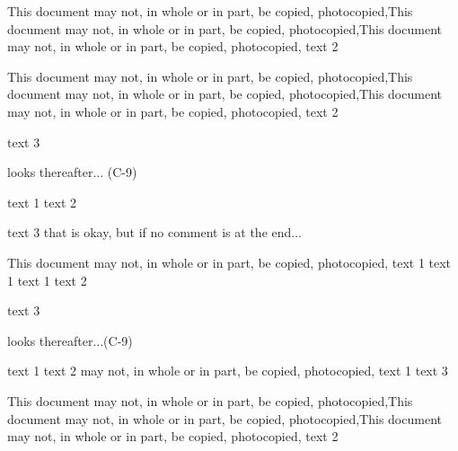 This document may not, in whole or in part, be copied, photocopied,This document may not, in whole or in part, be copied, photocopied,This document
may not, in whole or in part, be copied, photocopied, text 2
%
%
%
%
%
%
% 
%
%
%
% 
% 
%

This  document  may  not, in  whole  or in  part, be  copied,  photocopied,This  document  may  not, in  whole  or in  part, be  copied,  photocopied,This  document  may  not, in  whole  or in  part, be  copied,  photocopied,
text 2

text 3

looks thereafter... (C-9)

text 1 text 2

text 3
 that is okay, but if no comment is at the end...


This document may not, in whole or in part, be copied, photocopied, text 1
text 1 text 1 text 2 %

text 3

looks thereafter...(C-9)

text 1 text 2 may not, in whole or in part, be copied, photocopied, text 1
text 3

This  document  may  not, in  whole  or in  part, be  copied,  photocopied,This  document  may  not, in  whole  or in  part, be  copied,  photocopied,This  document  may  not, in  whole  or in  part, be  copied,  photocopied,
text 2
